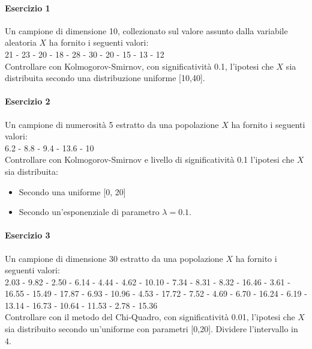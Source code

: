 \documentclass[12pt]{article}
\begin{document}
    \paragraph{Esercizio 1}
    Un campione di dimensione 10, collezionato sul valore assunto dalla variabile aleatoria $X$ ha fornito i seguenti valori:
    \\21 - 23 - 20 - 18 - 28 - 30 - 20 - 15 - 13 - 12
    \\Controllare con Kolmogorov-Smirnov, con significatività 0.1, l’ipotesi che $X$ sia distribuita secondo una distribuzione uniforme [10,40].
    \paragraph{Esercizio 2}
    Un campione di numerosità 5 estratto da una popolazione $X$ ha fornito i seguenti valori:
    \\6.2 - 8.8 - 9.4 - 13.6 - 10
    \\Controllare con Kolmogorov-Smirnov e livello di significatività 0.1 l’ipotesi che $X$ sia distribuita:
    \begin{itemize}
        \item Secondo una uniforme [0, 20]
        \item Secondo un’esponenziale di parametro $\lambda = 0.1$.
    \end{itemize}
    \paragraph{Esercizio 3}
    Un campione di dimensione 30 estratto da una popolazione $X$ ha fornito i seguenti valori:
    \\2.03 - 9.82 - 2.50 - 6.14 - 4.44 - 4.62 - 10.10 - 7.34 - 8.31 - 8.32 - 16.46 - 3.61 - 16.55 - 15.49 - 17.87 - 6.93 - 10.96 - 4.53 - 17.72 - 7.52 - 4.69 - 6.70 - 16.24 - 6.19 - 13.14 - 16.73 - 10.64 - 11.53 - 2.78 - 15.36
    \\Controllare con il metodo del Chi-Quadro, con significatività 0.01, l’ipotesi che $X$ sia distribuito secondo un’uniforme con parametri [0,20]. Dividere l’intervallo in 4.
\end{document}
